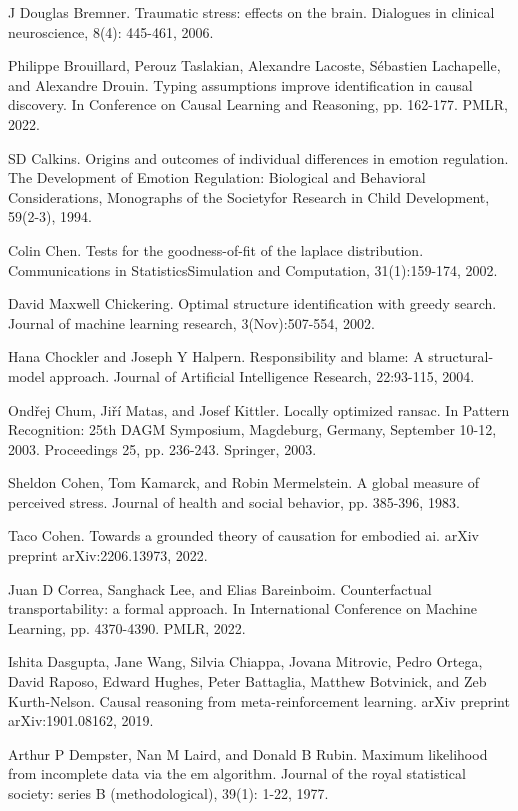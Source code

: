 \documentclass[10pt]{article}
\begin{document}
J Douglas Bremner. Traumatic stress: effects on the brain. Dialogues in clinical neuroscience, 8(4): 445-461, 2006.

Philippe Brouillard, Perouz Taslakian, Alexandre Lacoste, Sébastien Lachapelle, and Alexandre Drouin. Typing assumptions improve identification in causal discovery. In Conference on Causal Learning and Reasoning, pp. 162-177. PMLR, 2022.

SD Calkins. Origins and outcomes of individual differences in emotion regulation. The Development of Emotion Regulation: Biological and Behavioral Considerations, Monographs of the Societyfor Research in Child Development, 59(2-3), 1994.

Colin Chen. Tests for the goodness-of-fit of the laplace distribution. Communications in StatisticsSimulation and Computation, 31(1):159-174, 2002.

David Maxwell Chickering. Optimal structure identification with greedy search. Journal of machine learning research, 3(Nov):507-554, 2002.

Hana Chockler and Joseph Y Halpern. Responsibility and blame: A structural-model approach. Journal of Artificial Intelligence Research, 22:93-115, 2004.

Ondřej Chum, Jiří Matas, and Josef Kittler. Locally optimized ransac. In Pattern Recognition: 25th DAGM Symposium, Magdeburg, Germany, September 10-12, 2003. Proceedings 25, pp. 236-243. Springer, 2003.

Sheldon Cohen, Tom Kamarck, and Robin Mermelstein. A global measure of perceived stress. Journal of health and social behavior, pp. 385-396, 1983.

Taco Cohen. Towards a grounded theory of causation for embodied ai. arXiv preprint arXiv:2206.13973, 2022.

Juan D Correa, Sanghack Lee, and Elias Bareinboim. Counterfactual transportability: a formal approach. In International Conference on Machine Learning, pp. 4370-4390. PMLR, 2022.

Ishita Dasgupta, Jane Wang, Silvia Chiappa, Jovana Mitrovic, Pedro Ortega, David Raposo, Edward Hughes, Peter Battaglia, Matthew Botvinick, and Zeb Kurth-Nelson. Causal reasoning from meta-reinforcement learning. arXiv preprint arXiv:1901.08162, 2019.

Arthur P Dempster, Nan M Laird, and Donald B Rubin. Maximum likelihood from incomplete data via the em algorithm. Journal of the royal statistical society: series B (methodological), 39(1): 1-22, 1977.
\end{document}
